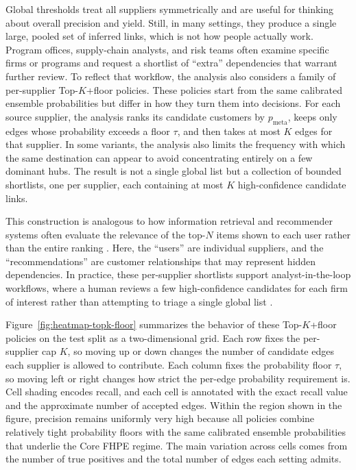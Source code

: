 Global thresholds treat all suppliers symmetrically and are useful for thinking about overall precision and yield. Still, in many settings, they produce a single large, pooled set of inferred links, which is not how people actually work. Program offices, supply-chain analysts, and risk teams often examine specific firms or programs and request a shortlist of ``extra'' dependencies that warrant further review. To reflect that workflow, the analysis also considers a family of per-supplier Top-\(K\)+floor policies. These policies start from the same calibrated ensemble probabilities but differ in how they turn them into decisions. For each source supplier, the analysis ranks its candidate customers by \(p_{\text{meta}}\), keeps only edges whose probability exceeds a floor \(\tau\), and then takes at most \(K\) edges for that supplier. In some variants, the analysis also limits the frequency with which the same destination can appear to avoid concentrating entirely on a few dominant hubs. The result is not a single global list but a collection of bounded shortlists, one per supplier, each containing at most \(K\) high-confidence candidate links.

This construction is analogous to how information retrieval and recommender systems often evaluate the relevance of the top-\(N\) items shown to each user rather than the entire ranking \parencite{manning_introduction_2008,herlocker_evaluating_2004,cremonesi_performance_2010}. Here, the ``users'' are individual suppliers, and the ``recommendations'' are customer relationships that may represent hidden dependencies. In practice, these per-supplier shortlists support analyst-in-the-loop workflows, where a human reviews a few high-confidence candidates for each firm of interest rather than attempting to triage a single global list \parencite{kamar_directions_2016,amershi_guidelines_2019}.

Figure~\ref{fig:heatmap-topk-floor} summarizes the behavior of these Top-\(K\)+floor policies on the test split as a two-dimensional grid. Each row fixes the per-supplier cap \(K\), so moving up or down changes the number of candidate edges each supplier is allowed to contribute. Each column fixes the probability floor \(\tau\), so moving left or right changes how strict the per-edge probability requirement is. Cell shading encodes recall, and each cell is annotated with the exact recall value and the approximate number of accepted edges. Within the region shown in the figure, precision remains uniformly very high because all policies combine relatively tight probability floors with the same calibrated ensemble probabilities that underlie the Core FHPE regime. The main variation across cells comes from the number of true positives and the total number of edges each setting admits.

